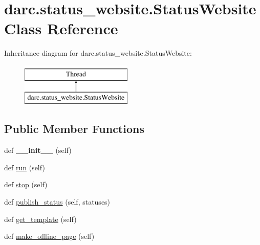 \hypertarget{classdarc_1_1status__website_1_1_status_website}{}\section{darc.\+status\+\_\+website.\+Status\+Website Class Reference}
\label{classdarc_1_1status__website_1_1_status_website}
Inheritance diagram for darc.\+status\+\_\+website.\+Status\+Website\+:\begin{figure}[H]
\begin{center}
\leavevmode
\includegraphics[height=2.000000cm]{classdarc_1_1status__website_1_1_status_website}
\end{center}
\end{figure}
\subsection*{Public Member Functions}
\begin{DoxyCompactItemize}
\item 
\mbox{\label{classdarc_1_1status__website_1_1_status_website_a4bbedcc5137e16a062788355330f3ae1}} 
def {\bfseries \+\_\+\+\_\+init\+\_\+\+\_\+} (self)
\item 
def \mbox{\hyperlink{classdarc_1_1status__website_1_1_status_website_a1c4011a001b22c3554f5a64373db58be}{run}} (self)
\item 
def \mbox{\hyperlink{classdarc_1_1status__website_1_1_status_website_a7d75733750c05bf3dfda95339be82f85}{stop}} (self)
\item 
def \mbox{\hyperlink{classdarc_1_1status__website_1_1_status_website_a2744dc19b5c043ea888bfb2f8a947da0}{publish\+\_\+status}} (self, statuses)
\item 
def \mbox{\hyperlink{classdarc_1_1status__website_1_1_status_website_a763be37122d5e36e243ed5b3b4a245ab}{get\+\_\+template}} (self)
\item 
def \mbox{\hyperlink{classdarc_1_1status__website_1_1_status_website_a76833ebe34c69c5344ea4f5c5439c0c8}{make\+\_\+offline\+\_\+page}} (self)
\end{DoxyCompactItemize}
